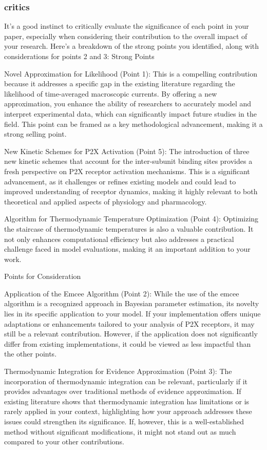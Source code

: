 \documentclass[pdflatex,sn-mathphys-num]{sn-jnl}%
\theoremstyle{thmstyleone}%
\theoremstyle{thmstyletwo}%
\theoremstyle{thmstylethree}%
\begin{document}
\subsubsection{critics}
It's a good instinct to critically evaluate the significance of each point in your paper, especially when considering their contribution to the overall impact of your research. Here’s a breakdown of the strong points you identified, along with considerations for points 2 and 3:
Strong Points

Novel Approximation for Likelihood (Point 1):
This is a compelling contribution because it addresses a specific gap in the existing literature regarding the likelihood of time-averaged macroscopic currents. By offering a new approximation, you enhance the ability of researchers to accurately model and interpret experimental data, which can significantly impact future studies in the field. This point can be framed as a key methodological advancement, making it a strong selling point.

New Kinetic Schemes for P2X Activation (Point 5):
The introduction of three new kinetic schemes that account for the inter-subunit binding sites provides a fresh perspective on P2X receptor activation mechanisms. This is a significant advancement, as it challenges or refines existing models and could lead to improved understanding of receptor dynamics, making it highly relevant to both theoretical and applied aspects of physiology and pharmacology.

Algorithm for Thermodynamic Temperature Optimization (Point 4):
Optimizing the staircase of thermodynamic temperatures is also a valuable contribution. It not only enhances computational efficiency but also addresses a practical challenge faced in model evaluations, making it an important addition to your work.

Points for Consideration

Application of the Emcee Algorithm (Point 2):
While the use of the emcee algorithm is a recognized approach in Bayesian parameter estimation, its novelty lies in its specific application to your model. If your implementation offers unique adaptations or enhancements tailored to your analysis of P2X receptors, it may still be a relevant contribution. However, if the application does not significantly differ from existing implementations, it could be viewed as less impactful than the other points.

Thermodynamic Integration for Evidence Approximation (Point 3):
The incorporation of thermodynamic integration can be relevant, particularly if it provides advantages over traditional methods of evidence approximation. If existing literature shows that thermodynamic integration has limitations or is rarely applied in your context, highlighting how your approach addresses these issues could strengthen its significance. If, however, this is a well-established method without significant modifications, it might not stand out as much compared to your other contributions.
\end{document}
